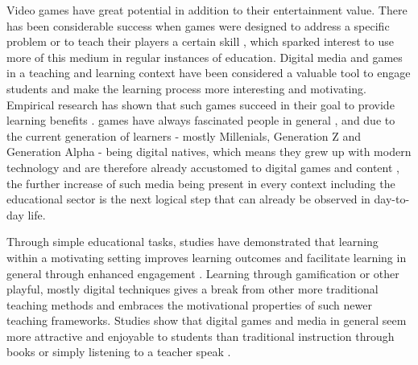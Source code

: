 Video games have great potential in addition to their entertainment value.
There has been considerable success when games were designed to address a specific problem or to teach their players a certain skill \cite{compare}, which sparked interest to use more of this medium in regular instances of education.
Digital media and games in a teaching and learning context have been considered a valuable tool to engage students and make the learning process more interesting and motivating. Empirical research has shown that such games succeed in their goal to provide learning benefits \cite{framework} \cite{compare} \cite{domestic}.
games have always fascinated people in general \cite{aspects}, and due to the current generation of learners - mostly Millenials, Generation Z and Generation Alpha - being digital natives, which means they grew up with modern technology and are therefore already accustomed to digital games and content \cite{edu} \cite{domestic}, the further increase of such media being present in every context including the educational sector is the next logical step that can already be observed in day-to-day life.

Through simple educational tasks, studies have demonstrated that learning within a motivating setting improves learning outcomes and facilitate learning in general through enhanced engagement \cite{aspects} \cite{edu}.
Learning through gamification or other playful, mostly digital techniques gives a break from other more traditional teaching methods and embraces the motivational properties of such newer teaching frameworks. Studies show that digital games and media in general seem more attractive and enjoyable to students than traditional instruction through books or simply listening to a teacher speak \cite{compare} \cite{domestic}.

